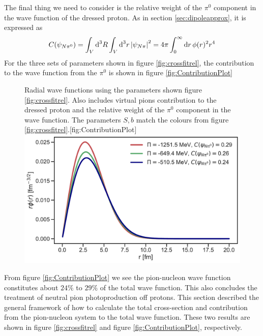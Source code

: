 The final thing we need to consider is the relative weight of the $\pi^0$ component in the wave function of the dressed proton. As in section \ref{sec:dipoleapprox}, it is expressed as 
\begin{equation}
	C(\psi_{N\pi^0})= \int_V \text{d}^3R \int_V \text{d}^3 r \, \abs{\psi_{N\pi}}^2 = 4\pi \int_0^\infty \text{d}r \, \phi(r)^2r^4
\end{equation}
For the three sets of parameters shown in figure \ref{fig:crossfitrel}, the contribution to the wave function from the $\pi^0$ is shown in figure \ref{fig:ContributionPlot}
\begin{figure}[H]
	\begin{sidecaption}{Radial wave functions using the parameters shown figure \ref{fig:crossfitrel}. Also includes virtual pions contribution to the dressed proton and the relative weight of the $\pi^0$ component in the wave function. The parameters $S,b$ match the colours from figure \ref{fig:crossfitrel}.}[fig:ContributionPlot]
		\includegraphics[width=\linewidth]{Figures/ContributionPlot.pdf} 
	\end{sidecaption}
\end{figure}
From figure \ref{fig:ContributionPlot} we see the pion-nucleon wave function constitutes about $24\%$ to $29\%$ of the total wave function. This also concludes the treatment of neutral pion photoproduction off protons. This section described the general framework of how to calculate the total cross-section and contribution from the pion-nucleon system to the total wave function. These two results are shown in figure \ref{fig:crossfitrel} and figure \ref{fig:ContributionPlot}, respectively. 
\newpage
